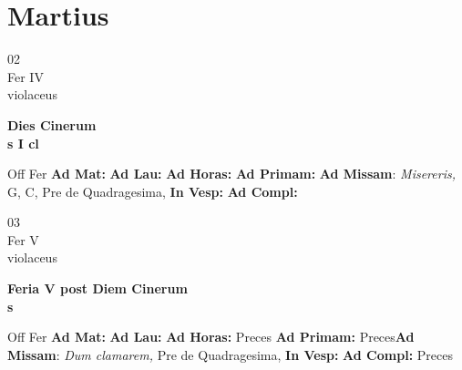 \documentclass[10pt, openany]{book}
\begin{document}
    \chapter{Martius}
                    
    \begin{center}
        \begin{minipage}{3.5in}
            \vspace{2em}
            \begin{minipage}{0.5in}
                {\Huge 02} \\
                {\normalsize Fer IV} \\
                {\normalsize violaceus}
            \end{minipage}
            \begin{minipage}{3.0in}
                \textbf{ \large Dies Cinerum \\
                \textnormal{\normalsize s I cl}} \\ 
            \end{minipage}
            \begin{justify}Off Fer
                \textbf{Ad Mat: }
                \textbf{Ad Lau: }
                \textbf{Ad Horas: }
                \textbf{Ad Primam: }\textbf{Ad Missam}: \textit{Misereris,} G, C, Pre de Quadragesima,  
                \textbf{In Vesp: }
                \textbf{Ad Compl: }
            \end{justify}
        \end{minipage}
    \end{center}

    \begin{center}
        \begin{minipage}{3.5in}
            \vspace{2em}
            \begin{minipage}{0.5in}
                {\Huge 03} \\
                {\normalsize Fer V} \\
                {\normalsize violaceus}
            \end{minipage}
            \begin{minipage}{3.0in}
                \textbf{ \large Feria V post Diem Cinerum \\
                \textnormal{\normalsize s}} \\ 
            \end{minipage}
            \begin{justify}Off Fer
                \textbf{Ad Mat: }
                \textbf{Ad Lau: }
                \textbf{Ad Horas: }Preces
                \textbf{Ad Primam: }Preces\textbf{Ad Missam}: \textit{Dum clamarem,} Pre de Quadragesima,  
                \textbf{In Vesp: }
                \textbf{Ad Compl: }Preces
            \end{justify}
        \end{minipage}
    \end{center}
\end{document}
